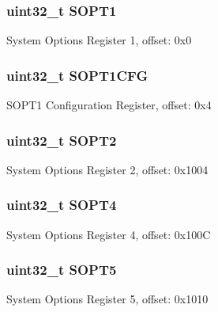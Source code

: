 \subsubsection[{S\+O\+P\+T1}]{\setlength{\rightskip}{0pt plus 5cm}uint32\+\_\+t S\+O\+P\+T1}\label{struct_s_i_m___mem_map_a4aba1e2e56918ee06126ced3810264d4}
System Options Register 1, offset\+: 0x0 \hypertarget{struct_s_i_m___mem_map_a8fdfe78d66039ba5cfbf48cf8a267bee}{}
\subsubsection[{S\+O\+P\+T1\+C\+F\+G}]{\setlength{\rightskip}{0pt plus 5cm}uint32\+\_\+t S\+O\+P\+T1\+C\+F\+G}\label{struct_s_i_m___mem_map_a8fdfe78d66039ba5cfbf48cf8a267bee}
S\+O\+P\+T1 Configuration Register, offset\+: 0x4 \hypertarget{struct_s_i_m___mem_map_aa99d50c9e64bf212c32cfde56465e569}{}
\subsubsection[{S\+O\+P\+T2}]{\setlength{\rightskip}{0pt plus 5cm}uint32\+\_\+t S\+O\+P\+T2}\label{struct_s_i_m___mem_map_aa99d50c9e64bf212c32cfde56465e569}
System Options Register 2, offset\+: 0x1004 \hypertarget{struct_s_i_m___mem_map_a6f70ab94a412c93f57c2ca3ee84dbdd3}{}
\subsubsection[{S\+O\+P\+T4}]{\setlength{\rightskip}{0pt plus 5cm}uint32\+\_\+t S\+O\+P\+T4}\label{struct_s_i_m___mem_map_a6f70ab94a412c93f57c2ca3ee84dbdd3}
System Options Register 4, offset\+: 0x100\+C \hypertarget{struct_s_i_m___mem_map_adff606be08a472231b4f9f5afd603bd6}{}
\subsubsection[{S\+O\+P\+T5}]{\setlength{\rightskip}{0pt plus 5cm}uint32\+\_\+t S\+O\+P\+T5}\label{struct_s_i_m___mem_map_adff606be08a472231b4f9f5afd603bd6}
System Options Register 5, offset\+: 0x1010 \hypertarget{struct_s_i_m___mem_map_a613f7f9e67cc95762537d6cbf4800ae0}{}
